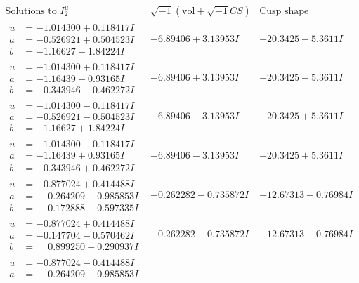 \documentclass[1p]{elsarticle_modified}
\theoremstyle{definition}
\newcommand{\I}{\sqrt{-1}}
\begin{document}
$$\begin{array}{c|c|c}  
\text{Solutions to }I^u_{2}& \I (\text{vol} + \sqrt{-1}CS) & \text{Cusp shape}\\
 \hline 
\begin{aligned}
u &= -1.014300 + 0.118417 I \\
a &= -0.526921 + 0.504523 I \\
b &= -1.16627 - 1.84224 I\end{aligned}
 & -6.89406 + 3.13953 I & -20.3425 - 5.3611 I \\ \hline\begin{aligned}
u &= -1.014300 + 0.118417 I \\
a &= -1.16439 - 0.93165 I \\
b &= -0.343946 - 0.462272 I\end{aligned}
 & -6.89406 + 3.13953 I & -20.3425 - 5.3611 I \\ \hline\begin{aligned}
u &= -1.014300 - 0.118417 I \\
a &= -0.526921 - 0.504523 I \\
b &= -1.16627 + 1.84224 I\end{aligned}
 & -6.89406 - 3.13953 I & -20.3425 + 5.3611 I \\ \hline\begin{aligned}
u &= -1.014300 - 0.118417 I \\
a &= -1.16439 + 0.93165 I \\
b &= -0.343946 + 0.462272 I\end{aligned}
 & -6.89406 - 3.13953 I & -20.3425 + 5.3611 I \\ \hline\begin{aligned}
u &= -0.877024 + 0.414488 I \\
a &= \phantom{-}0.264209 + 0.985853 I \\
b &= \phantom{-}0.172888 - 0.597335 I\end{aligned}
 & -0.262282 - 0.735872 I & -12.67313 - 0.76984 I \\ \hline\begin{aligned}
u &= -0.877024 + 0.414488 I \\
a &= -0.147704 - 0.570462 I \\
b &= \phantom{-}0.899250 + 0.290937 I\end{aligned}
 & -0.262282 - 0.735872 I & -12.67313 - 0.76984 I \\ \hline\begin{aligned}
u &= -0.877024 - 0.414488 I \\
a &= \phantom{-}0.264209 - 0.985853 I \\

\end{aligned}
\end{array}$$
\end{document}

